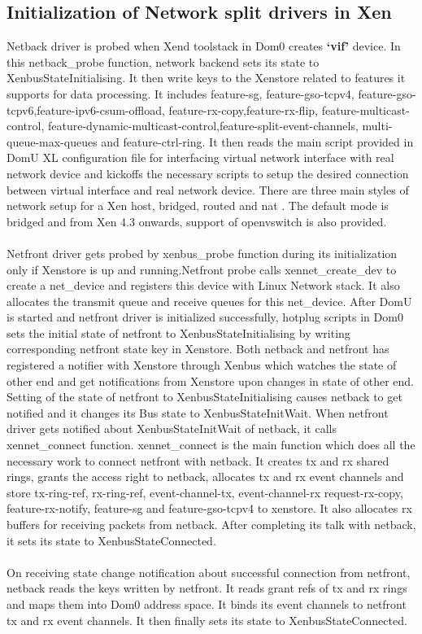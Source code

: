\subsection{Initialization of Network split drivers in Xen \label{sec:initnet}}
Netback driver is probed when Xend toolstack in Dom0 creates \textbf{`vif'} device. In this netback\_probe function, network backend sets its state to XenbusStateInitialising. It then write keys to the Xenstore related to features it supports for data processing. It includes feature-sg, feature-gso-tcpv4, feature-gso-tcpv6,feature-ipv6-csum-offload, feature-rx-copy,feature-rx-flip, feature-multicast-control, feature-dynamic-multicast-control,feature-split-event-channels, multi-queue-max-queues and feature-ctrl-ring. It then reads the main script provided in DomU XL configuration file for interfacing virtual network interface with real network device and kickoffs the necessary scripts to setup the desired connection between virtual interface and real network device. There are three main styles of network setup for a Xen host, bridged, routed and nat \cite{xen_network}. The default mode is bridged and from Xen 4.3 onwards, support of openvswitch is also provided.
\\
\\
Netfront driver gets probed by xenbus\_probe function during its initialization only if Xenstore is up and running.Netfront probe calls xennet\_create\_dev to create a net\_device and registers this device with Linux Network stack. It also allocates the transmit queue and receive queues for this net\_device. After DomU is started and netfront driver is initialized successfully, hotplug scripts in Dom0 sets the initial state of netfront to XenbusStateInitialising by writing corresponding netfront state key in Xenstore. Both netback and netfront has registered a notifier with Xenstore through Xenbus which watches the state of other end and get notifications from Xenstore upon changes in state of other end. Setting of the state of netfront to XenbusStateInitialising causes netback to get notified and it changes its Bus state to XenbusStateInitWait. When netfront driver gets notified about XenbusStateInitWait of netback, it calls xennet\_connect function. xennet\_connect is the main function which does all the necessary work to connect netfront with netback. It  creates tx and rx shared rings, grants the access right to netback, allocates tx and rx event channels and store tx-ring-ref, rx-ring-ref, event-channel-tx, event-channel-rx request-rx-copy, feature-rx-notify, feature-sg and feature-gso-tcpv4 to xenstore. It also allocates rx buffers for receiving packets from netback. After completing its talk with netback, it sets its state to XenbusStateConnected. 
\\
\\
On receiving state change notification about successful connection from netfront, netback reads the keys written by netfront. It reads grant refs of tx and rx rings and maps them into Dom0 address space. It binds its event channels to netfront tx and rx event channels. It then finally sets its state to XenbusStateConnected.


